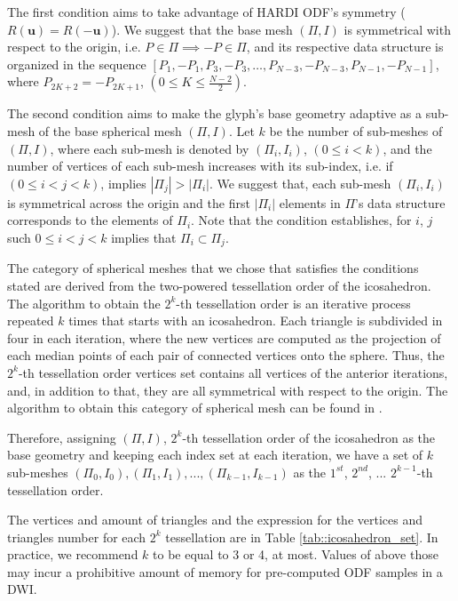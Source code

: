 \documentclass[twoside,twocolumn,10pt]{article}
\begin{document}
The first condition aims to take advantage of HARDI ODF's symmetry ($R(\bm{u}) = R(-\bm{u})$). We suggest that the base mesh $(\Pi, I)$ is symmetrical with respect to the origin, i.e. $P \in \Pi \implies -P \in \Pi$, and its respective data structure is organized in the sequence $[P_1, -P_1, P_3, -P_3, \dots, P_{N-3}, -P_{N-3}, P_{N-1}, -P_{N-1}]$, where $P_{2K+2} = -P_{2K+1}$, $(0 \leq K \leq \frac{N-2}{2})$.

The second condition aims to make the glyph's base geometry adaptive as a sub-mesh of the base spherical mesh $(\Pi, I)$. Let $k$ be the number of sub-meshes of $(\Pi, I)$, where each sub-mesh is denoted by $(\Pi_i, I_i)$,  $(0 \leq i < k)$, and the number of vertices of each sub-mesh increases with its sub-index, i.e. if  $(0 \leq i < j < k)$, implies $|\Pi_j| > |\Pi_i|$. We suggest that, each sub-mesh $(\Pi_i, I_i)$ is symmetrical across the origin and the first $|\Pi_i|$ elements in  $\Pi$'s data structure corresponds to the elements of $\Pi_i$. Note that the condition establishes, for $i$, $j$ such $0 \leq i < j < k$ implies that $\Pi_i \subset \Pi_j$.

The category of spherical meshes that we chose that satisfies the conditions stated are derived from the two-powered tessellation order of the icosahedron. The algorithm to obtain the $2^k$-th tessellation order is an iterative process repeated $k$ times that starts with an icosahedron. Each triangle is subdivided in four in each iteration, where the new vertices are computed as the projection of each median points of each pair of connected vertices onto the sphere. Thus, the $2^k$-th tessellation order vertices set contains all vertices of the anterior iterations, and, in addition to that, they are all symmetrical with respect to the origin. The algorithm to obtain this category of spherical mesh can be found in \cite{luna2012}.

Therefore, assigning $(\Pi, I)$, $2^{k}$-th tessellation order of the icosahedron as the base geometry and keeping each index set at each iteration, we have a set of $k$ sub-meshes $(\Pi_0, I_0), (\Pi_1, I_1), ..., (\Pi_{k-1}, I_{k-1})$ as the $1^{st}$, $2^{nd}$, ... $2^{k-1}$-th tessellation order.




The vertices and amount of triangles and the expression for the vertices and triangles number for each $2^k$ tessellation are in Table \ref{tab::icosahedron_set}. In practice, we recommend $k$ to be equal to 3 or 4, at most. Values of above those may incur a prohibitive amount of memory for pre-computed ODF samples in a DWI.
\end{document}
